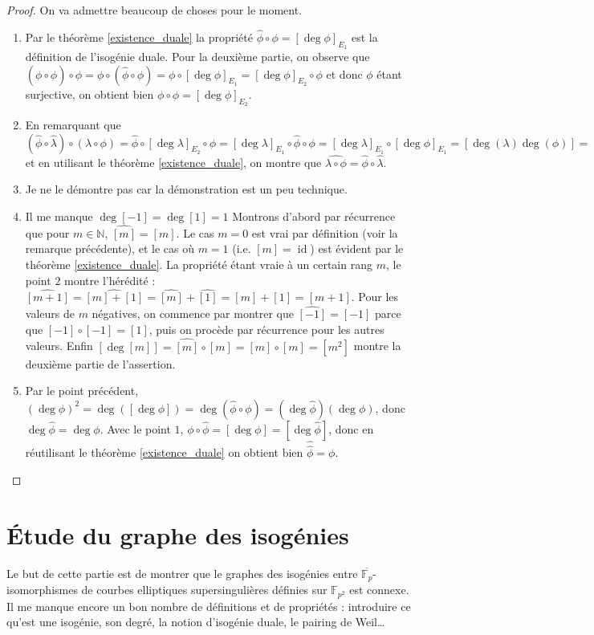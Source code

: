 \documentclass{article}
\theoremstyle{plain}%
\theoremstyle{definition}%
\newcommand{\F}{\mathbb{F}}
\newcommand{\N}{\mathbb{N}}
\newcommand{\h}{\widehat}
\DeclareMathOperator{\id}{id}
\begin{document}
\begin{proof}
  On va admettre beaucoup de choses pour le moment.
  \begin{enumerate}
    \item Par le théorème \ref{existence_duale} la propriété $\h\phi\circ\phi = [\deg{\phi}]_{E_1}$ est la définition de l'isogénie duale. Pour la deuxième partie, on observe que $(\phi\circ\h\phi)\circ\phi = \phi\circ(\h\phi\circ\phi) = \phi\circ[\deg{\phi}]_{E_1} = [\deg{\phi}]_{E_2}\circ\phi$ et donc $\phi$ étant surjective, on obtient bien $\phi\circ\h\phi = [\deg{\phi}]_{E_2}$.
    \item En remarquant que $(\h\phi\circ\h\lambda)\circ(\lambda\circ\phi) = \h\phi\circ [\deg\lambda]_{E_2} \circ\phi = [\deg\lambda]_{E_1}\circ\h\phi\circ\phi = [\deg\lambda]_{E_1}\circ [\deg\phi]_{E_1} = [\deg(\lambda)\deg(\phi)] = [\deg(\lambda\circ\phi)]$ et en utilisant le théorème \ref{existence_duale}, on montre que $\h{\lambda\circ\phi} = \h\phi\circ\h\lambda$.
    \item Je ne le démontre pas car la démonstration est un peu technique.
    \item {\color{blue} Il me manque $\deg[-1] = \deg[1] = 1$} Montrons d'abord par récurrence que pour $m\in\N$, $\h{[m]} = [m]$. Le cas $m=0$ est vrai par définition (voir la remarque précédente), et le cas où $m=1$ (i.e. $[m] = \id$) est évident par le théorème \ref{existence_duale}. La propriété étant vraie à un certain rang $m$, le point $2$ montre l'hérédité : $\h{[m+1]} = \h{[m] + [1]} = \h{[m]} + \h{[1]} = [m] + [1] = [m+1]$. Pour les valeurs de $m$ négatives, on commence par montrer que $\h{[-1]} = [-1]$ parce que $[-1] \circ [-1] = [1]$, puis on procède par récurrence pour les autres valeurs.
      Enfin $[\deg [m]] = \h{[m]} \circ [m] = [m] \circ [m] = [m^2]$ montre la deuxième partie de l'assertion.
    \item Par le point précédent, $ (\deg\phi)^2=\deg([\deg\phi])=\deg(\h\phi\circ\phi) = (\deg\h\phi)(\deg\phi)$, donc $\deg\h\phi = \deg\phi$. Avec le point $1$, $\phi\circ\h\phi = [\deg\phi] = [\deg \h\phi]$, donc en réutilisant le théorème \ref{existence_duale} on obtient bien $\h{\h\phi} = \phi$.
  \end{enumerate}
\end{proof}

\section{Étude du graphe des isogénies}
Le but de cette partie est de montrer que le graphes des isogénies entre $\overline{\F_p}$-isomorphismes de courbes elliptiques supersingulières définies sur $\F_{p^2}$ est connexe. Il me manque encore un bon nombre de définitions et de propriétés : introduire ce qu'est une isogénie, son degré, la notion d'isogénie duale, le pairing de Weil\ldots
\end{document}
